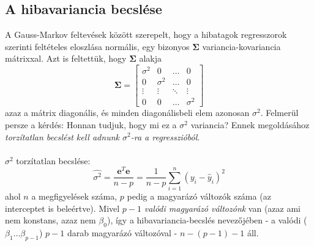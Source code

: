 \documentclass[14p]{report}
\def\pmb{\boldsymbol}
\begin{document}
	\subsection{A hibavariancia becslése}
	A Gauss-Markov feltevések között szerepelt, hogy a hibatagok regresszorok szerinti feltételes eloszlása normális, egy bizonyos $\pmb{\Sigma}$ variancia-kovariancia mátrixxal. Azt is feltettük, hogy $\pmb{\Sigma}$ alakja
	\[
	\pmb{\Sigma} =
	\begin{bmatrix}
		\sigma^2 & 0 & \dots & 0 \\
		0 & \sigma^2 & \dots & 0 \\
		\vdots & \vdots & \ddots & \vdots \\
		0 & 0 & \dots & \sigma^2
	\end{bmatrix}
	\]
	azaz a mátrix diagonális, és minden diagonálisbeli elem azonosan $\sigma^2$. Felmerül persze a kérdés: Honnan tudjuk, hogy mi ez a $\sigma^2$ variancia? Ennek megoldásához \emph{torzítatlan becslést kell adnunk $\sigma^2$-ra a regresszióból}.
	\\
	\\
	$\sigma^2$ torzítatlan becslése:
	\[
	\widehat{\sigma^2} = \frac{\pmb{e}^T\pmb{e}}{n-p} = \frac{1}{n-p}\sum_{i=1}^{n}{(y_i - \hat{y}_i)^2}
	\]
	ahol $n$ a megfigyelések száma, $p$ pedig a magyarázó változók száma (az interceptet is beleértve). Mivel $p-1$ \emph{valódi magyarázó változónk} van (azaz ami nem konstans, azaz nem $\beta_0$), így a hibavariancia-becslés nevezőjében - a valódi ($\beta_1 \dots \beta_{p-1}$) $p-1$ darab magyarázó változóval - $n-(p-1)-1$ áll.
	
\end{document}
